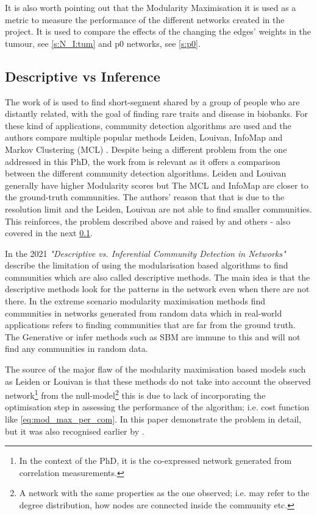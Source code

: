 It is also worth pointing out that the Modularity Maximisation it is used as a metric to measure the performance of the different networks created in the project. It is used to compare the effects of the changing the edges' weights in the tumour, see \cref{s:N_I:tum} and p0 networks, see \cref{s:p0}.


\subsection{Descriptive vs Inference} \label{s:lit:descriptive_inference}

The work of \citet{Shemirani2023-ww} is used to find short-segment shared by a group of people who are distantly related, with the goal of finding rare traits and disease in biobanks. For these kind of applications, community detection algorithms are used and the authors compare multiple popular methods Leiden, Louivan, InfoMap \citep{Rosvall2008-kw} and Markov Clustering (MCL) \citep{Van_Dongen2008-yj}. Despite being a different problem from the one addressed in this PhD, the work from \citet{Shemirani2023-ww} is relevant as it offers a comparison between the different community detection algorithms. Leiden and Louivan generally have higher Modularity scores but The MCL and InfoMap are closer to the ground-truth communities. The authors' reason that that is due to the resolution limit and the Leiden, Louivan are not able to find smaller communities. This reinforces, the problem described above and raised by \citep{Peixoto2021-jx} and others \citep{Fortunato2007-gh, Traag2019-ne} - also covered in the next \cref{s:lit:descriptive_inference}.

In the 2021 \textit{"Descriptive vs. Inferential Community Detection in Networks"} \citep{Peixoto2021-jx} describe the limitation of using the modularisation based algorithms to find communities which are also called descriptive methods. The main idea is that the descriptive methods look for the patterns in the network even when there are not there. In the extreme scenario modularity maximisation methods find communities in networks generated from random data which in real-world applications refers to finding communities that are far from the ground truth. The  Generative or infer methods such as SBM are immune to this and will not find any communities in random data.

The source of the major flaw of the modularity maximisation based models such as Leiden or Louivan is that these methods do not take into account the observed network\footnote{In the context of the PhD, it is the co-expressed network generated from correlation measurements.} from the null-model\footnote{A network with the same properties as the one observed; i.e. may refer to the degree distribution, how nodes are connected inside the community etc.} this is due to lack of incorporating the optimisation step in assessing the performance of the algorithm; i.e. cost function like \cref{eq:mod_max_per_com}. In this paper \citet{Peixoto2021-jx} demonstrate the problem in detail, but it was also recognised earlier by \citet{Guimera2004-gv}.

